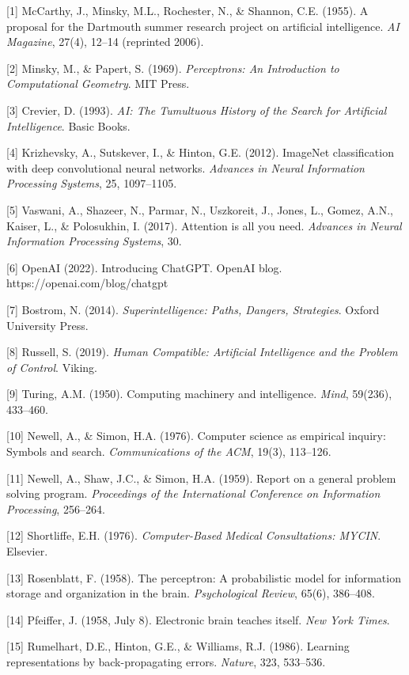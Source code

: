 \documentclass[
  11pt,
  letterpaper,
]{article}
\begin{document}
{[}1{]} McCarthy, J., Minsky, M.L., Rochester, N., \& Shannon, C.E.
(1955). A proposal for the Dartmouth summer research project on
artificial intelligence. \emph{AI Magazine}, 27(4), 12--14 (reprinted
2006).

{[}2{]} Minsky, M., \& Papert, S. (1969). \emph{Perceptrons: An
Introduction to Computational Geometry}. MIT Press.

{[}3{]} Crevier, D. (1993). \emph{AI: The Tumultuous History of the
Search for Artificial Intelligence}. Basic Books.

{[}4{]} Krizhevsky, A., Sutskever, I., \& Hinton, G.E. (2012). ImageNet
classification with deep convolutional neural networks. \emph{Advances
in Neural Information Processing Systems}, 25, 1097--1105.

{[}5{]} Vaswani, A., Shazeer, N., Parmar, N., Uszkoreit, J., Jones, L.,
Gomez, A.N., Kaiser, L., \& Polosukhin, I. (2017). Attention is all you
need. \emph{Advances in Neural Information Processing Systems}, 30.

{[}6{]} OpenAI (2022). Introducing ChatGPT. OpenAI blog.
https://openai.com/blog/chatgpt

{[}7{]} Bostrom, N. (2014). \emph{Superintelligence: Paths, Dangers,
Strategies}. Oxford University Press.

{[}8{]} Russell, S. (2019). \emph{Human Compatible: Artificial
Intelligence and the Problem of Control}. Viking.

{[}9{]} Turing, A.M. (1950). Computing machinery and intelligence.
\emph{Mind}, 59(236), 433--460.

{[}10{]} Newell, A., \& Simon, H.A. (1976). Computer science as
empirical inquiry: Symbols and search. \emph{Communications of the ACM},
19(3), 113--126.

{[}11{]} Newell, A., Shaw, J.C., \& Simon, H.A. (1959). Report on a
general problem solving program. \emph{Proceedings of the International
Conference on Information Processing}, 256--264.

{[}12{]} Shortliffe, E.H. (1976). \emph{Computer-Based Medical
Consultations: MYCIN}. Elsevier.

{[}13{]} Rosenblatt, F. (1958). The perceptron: A probabilistic model
for information storage and organization in the brain.
\emph{Psychological Review}, 65(6), 386--408.

{[}14{]} Pfeiffer, J. (1958, July 8). Electronic brain teaches itself.
\emph{New York Times}.

{[}15{]} Rumelhart, D.E., Hinton, G.E., \& Williams, R.J. (1986).
Learning representations by back-propagating errors. \emph{Nature}, 323,
533--536.
\end{document}
